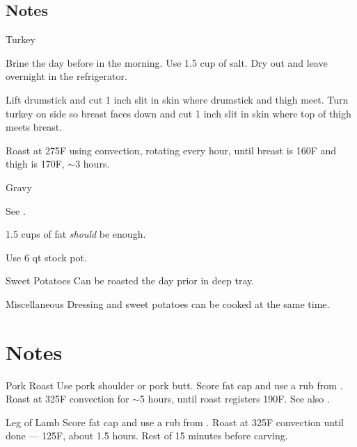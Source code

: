 \documentclass[oneside]{book}  %
\def\thisrecipe{}  %
\newcommand{\recipe}[1]{\section{#1}\def\thisrecipe{: #1}} %
\newcommand{\degF}{\textdegree F\xspace}
\newcommand{\about}{$\sim$}
\begin{document}
\subsection{Notes}
\begin{twocols} \begin{kitchennotes}
  \item[Turkey] \begin{kitchensubnotes}
    \item Brine the day before in the morning. Use 1.5 cup of salt. Dry out and
      leave overnight in the refrigerator.
    \item {} Lift drumstick and
      cut 1 inch slit in skin where drumstick and thigh meet. Turn turkey on
      side so breast faces down and cut 1 inch slit in skin where top of thigh
      meets breast.
    \item Roast at 275\degF using convection, rotating every hour, until breast
      is 160\degF and thigh is 170\degF, \about 3 hours.
  \end{kitchensubnotes}

  \item[Gravy] \begin{kitchensubnotes}
    \item See .
    \item 1.5 cups of fat \emph{should} be enough.
    \item Use 6 qt stock pot.
  \end{kitchensubnotes}

  \item[Sweet Potatoes]
  Can be roasted the day prior in deep tray.

  \item[Miscellaneous]
  Dressing and sweet potatoes can be cooked at the same time.
\end{kitchennotes} \end{twocols}
\recipe{Notes} \label{notes:dinners_leftovers} %
\begin{kitchennotes}
  \item[Pork Roast]  
    Use pork shoulder or pork butt. Score fat cap and use a rub from
    . Roast at 325\degF convection for
    \about 5 hours, until roast registers 190\degF. See also \CICookbook[418].
  \item[Leg of Lamb]  
    Score fat cap and use a rub from . Roast
    at 325\degF convection until done --- 125\degF, about 1.5 hours. Rest of 15
    minutes before carving.
\end{kitchennotes}
\end{document}
